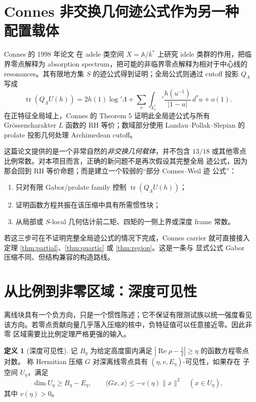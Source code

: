 \documentclass[UTF8,11pt,a4paper]{ctexart}
\theoremstyle{definition}
\newtheorem{definition}[theorem]{定义}
\theoremstyle{remark}
\newcommand{\tr}{\operatorname{tr}}
\newcommand{\Rea}{\operatorname{Re}}
\begin{document}
\section{Connes 非交换几何迹公式作为另一种配置载体}

Connes 的 1998 年论文 \cite{Connes98} 在 adele 类空间
$X=\mathbb A/k^*$ 上研究 idele 类群的作用，把临界零点解释为 absorption
spectrum，把可能的非临界零点解释为相对于中心线的 resonances。其有限地方集
$S$ 的迹公式得到证明；全局公式则通过 cutoff 投影 $Q_\Lambda$ 写成
\[
 \tr(Q_\Lambda U(h))
 =2h(1)\log'\Lambda+
 \sum_v\int_{k_v^*}'\frac{h(u^{-1})}{|1-u|}\,d^*u+o(1).
\]
在正特征全局域上，Connes 的 Theorem 5 证明此全局迹公式与所有
Grössencharakter $L$ 函数的 RH 等价；数域部分使用
Landau--Pollak--Slepian 的 prolate 投影几何处理 Archimedean cutoff。

这篇论文提供的是一个非常自然的\emph{非交换几何载体}，并不包含
$13/18$ 或其他零点比例常数。对本项目而言，正确的新问题不是再次假设其完整全局
迹公式，因为那会回到 RH 等价命题；而是建立一个较弱的“部分 Connes--Weil 迹
公式”：
\begin{enumerate}
\item 只对有限 Gabor/prolate family 控制 $\tr(Q_\Lambda U(h))$；
\item 证明函数方程共振在该压缩中具有所需惯性块；
\item 从局部或 $S$-local 几何估计前二矩、四矩的一侧上界或深度 frame 常数。
\end{enumerate}
若这三步可在不证明完整全局迹公式的情况下完成，Connes carrier 就可直接接入
定理 \ref{thm:partial}、\ref{thm:quartic} 或 \ref{thm:region}。这是一条与
显式公式 Gabor 压缩不同、但结构兼容的构造路线。

\section{从比例到非零区域：深度可见性}

离线块具有一个负方向，只是一个惯性陈述；它不保证有限测试族以统一强度看见
该方向。若零点贡献向量几乎落入压缩的核中，负特征值可以任意接近零。因此非零
区域需要比比例定理严格更强的输入。

\begin{definition}[深度可见性]\label{def:visibility}
记 $B_\eta$ 为给定高度窗内满足
$|\Rea\rho-\tfrac12|\ge\eta$ 的函数方程零点对数。
称 Hermitian 压缩 $G$ 对深离线零点具有 $(\eta,v,E_\eta)$-可见性，如果存在
子空间 $U_\eta$，满足
\[
 \dim U_\eta\ge B_\eta-E_\eta,\qquad
 \langle Gx,x\rangle\le-v(\eta)\|x\|^2
 \quad(x\in U_\eta),
\]
其中 $v(\eta)>0$。
\end{definition}
\end{document}
